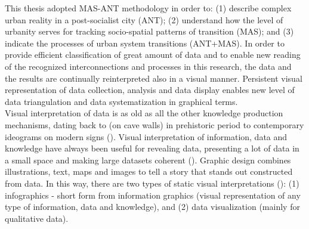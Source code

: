 \documentclass[11pt]{report}
\begin{document}
This thesis adopted MAS-ANT methodology in order to:
(1) describe complex urban reality in a post-socialist city (ANT);
(2) understand how the level of urbanity serves for tracking socio-spatial patterns of transition (MAS);
and
(3) indicate the processes of urban system transitions (ANT+MAS).
In order to provide efficient classification of great amount of data and to enable new reading of the recognized interconnections and processes in this research, the data and the results are continually reinterpreted also in a visual manner.
Persistent visual representation of data collection, analysis and data display enables new level of data triangulation and data systematization in graphical terms.
\\

Visual interpretation of data is as old as all the other knowledge production mechanisms, dating back to (on cave walls) in prehistoric period to contemporary ideograms on modern signs (\href{Krum}{\citealt{Krum}}).
Visual interpretation of information, data and knowledge have always been useful for revealing data, presenting a lot of data in a small space and making large datasets coherent (\href{Tufte}{\citealt{Tufte}}).
Graphic design combines illustrations, text, maps and images to tell a story that stands out constructed from data. 
In this way, there are two types of static visual interpretations (\href{Krum}{\citealt{Krum}}):
(1) infographics - short form from information graphics (visual representation of any type of information, data and knowledge), and
(2) data visualization (mainly for qualitative data).
\\
\end{document}
